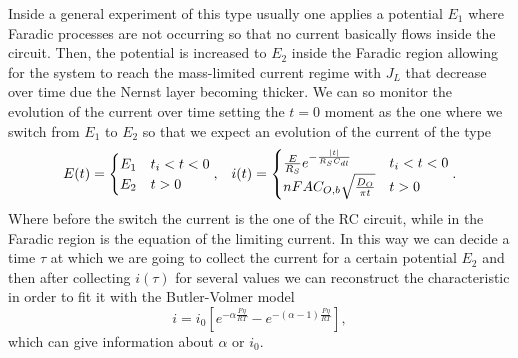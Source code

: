 Inside a general experiment of this type usually one applies a potential $E_1$ where Faradic processes are not occurring so that no current basically flows inside the circuit. Then, the potential is increased to $E_2$ inside the Faradic region allowing for the system to reach the mass-limited current regime with $J_L$ that decrease over time due the Nernst layer becoming thicker. We can so monitor the evolution of the current over time setting the $t=0$ moment as the one where we switch from $E_1$ to $E_2$ so that we expect an evolution of the current of the type
\begin{align}
    &E(t) = \begin{cases}
        E_1 & t_i < t < 0\\
        E_2 & t > 0
    \end{cases}, &i(t) = \begin{cases}
        \frac{E}{R_S}e^{-\frac{\abs{t}}{R_SC_{dl}}} & t_i < t < 0\\
        nFAC_{O,b}\sqrt{\frac{D_O}{\pi t}} & t > 0
    \end{cases}.
\end{align}
Where before the switch the current is the one of the RC circuit, while in the Faradic region is the equation of the limiting current. In this way we can decide a time $\tau$ at which we are going to collect the current for a certain potential $E_2$ and then after collecting $i(\tau)$ for several values we can reconstruct the characteristic in order to fit it with the Butler-Volmer model 
\begin{equation}
    i = i_0\left[ e^{-\alpha\frac{F\eta}{RT}} - e^{-(\alpha - 1)\frac{F\eta}{RT}} \right],
\end{equation}
which can give information about $\alpha$ or $i_0$.

